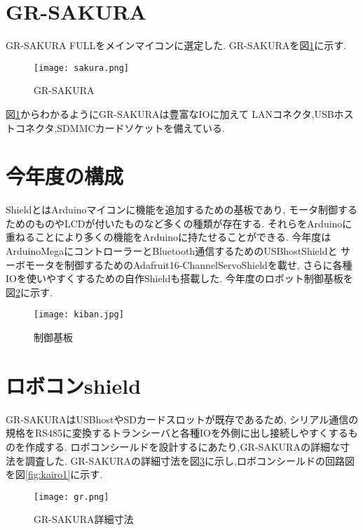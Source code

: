 \documentclass[12pt,oneside]{paper}
\begin{document}
\section{GR-SAKURA}
GR-SAKURA FULLをメインマイコンに選定した.
GR-SAKURAを図\ref{fig:sakura}に示す.\\
\begin{figure}[H]
 \begin{center}
  \texttt{[image: sakura.png]}
 \end{center}
 \caption{GR-SAKURA}
 \label{fig:sakura}
\end{figure}
図\ref{fig:sakura}からわかるようにGR-SAKURAは豊富なIOに加えて
LANコネクタ,USBホストコネクタ,SDMMCカードソケットを備えている.\\


\section{今年度の構成}
ShieldとはArduinoマイコンに機能を追加するための基板であり,
モータ制御するためのものやLCDが付いたものなど多くの種類が存在する.
それらをArduinoに重ねることにより多くの機能をArduinoに持たせることができる.
今年度はArduinoMegaにコントローラーとBluetooth通信するためのUSBhostShieldと
サーボモータを制御するためのAdafruit16-ChannelServoShieldを載せ,
さらに各種IOを使いやすくするための自作Shieldも搭載した.
今年度のロボット制御基板を図\ref{fig:kiban}に示す.


\begin{figure}[H]
 \begin{center}
  \texttt{[image: kiban.jpg]}
 \end{center}
 \caption{制御基板}
 \label{fig:kiban}
\end{figure}

\section{ロボコンshield}
GR-SAKURAはUSBhostやSDカードスロットが既存であるため,
シリアル通信の規格をRS485に変換するトランシーバと各種IOを外側に出し接続しやすくするものを作成する.
ロボコンシールドを設計するにあたり,GR-SAKURAの詳細な寸法を調査した.
GR-SAKURAの詳細寸法を図\ref{fig:sunpo}に示し,ロボコンシールドの回路図を図\ref{fig:kairo1}に示す.\\

\begin{figure}[H]
 \begin{center}
  \texttt{[image: gr.png]}
 \end{center}
 \caption{GR-SAKURA詳細寸法}
 \label{fig:sunpo}
\end{figure}
\end{document}
